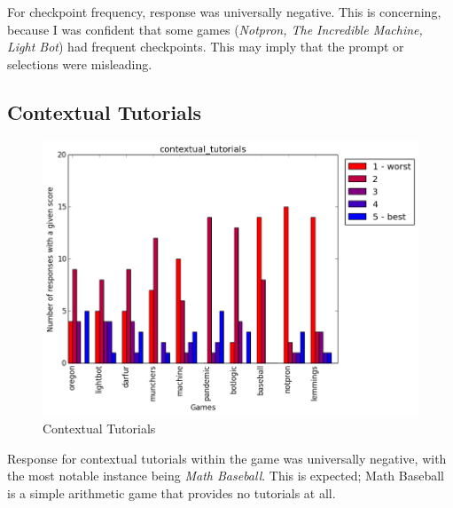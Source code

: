 				For checkpoint frequency, response was universally negative. This is concerning, because I was confident that some games (\textit{Notpron, The Incredible Machine, Light Bot}) had frequent checkpoints. This may imply that the prompt or selections were misleading.

			\subsection{Contextual Tutorials}
				\begin{figure}[] 
				\centering 
				\includegraphics[width=\textwidth, height=.4\textheight, keepaspectratio=true]{contextual_tutorials_scores.png} 
				\caption{Contextual Tutorials}
				\end{figure}

				Response for contextual tutorials within the game was universally negative, with the most notable instance being \textit{Math Baseball}. This is expected; Math Baseball is a simple arithmetic game that provides no tutorials at all.


